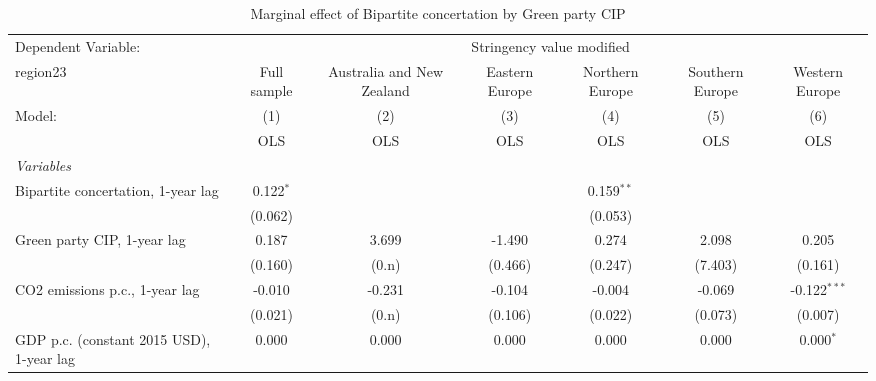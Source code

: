 
\begin{table}[htbp]
   \caption{Marginal effect of Bipartite concertation by Green party CIP}
   \centering
   \begin{tabular}{lcccccc}
      \toprule
      Dependent Variable: & \multicolumn{6}{c}{Stringency value modified}\\
      region23                                                         & Full sample   & Australia and New Zealand & Eastern Europe & Northern Europe & Southern Europe & Western Europe \\   
      Model:                                                           & (1)           & (2)                       & (3)            & (4)             & (5)             & (6)\\  
                                                                       &  OLS          & OLS                       & OLS            & OLS             & OLS             & OLS\\  
      \midrule
      \emph{Variables}\\
      Bipartite concertation, 1-year lag                               & 0.122$^{*}$   &                           &                & 0.159$^{**}$    &                 &   \\   
                                                                       & (0.062)       &                           &                & (0.053)         &                 &   \\   
      Green party CIP, 1-year lag                                      & 0.187         & 3.699                     & -1.490         & 0.274           & 2.098           & 0.205\\   
                                                                       & (0.160)       & (0.n)                     & (0.466)        & (0.247)         & (7.403)         & (0.161)\\   
      CO2 emissions p.c., 1-year lag                                   & -0.010        & -0.231                    & -0.104         & -0.004          & -0.069          & -0.122$^{***}$\\   
                                                                       & (0.021)       & (0.n)                     & (0.106)        & (0.022)         & (0.073)         & (0.007)\\   
      GDP p.c. (constant 2015 USD), 1-year lag                         & 0.000         & 0.000                     & 0.000          & 0.000           & 0.000           & 0.000$^{*}$\\   

\end{tabular}
\end{table}
